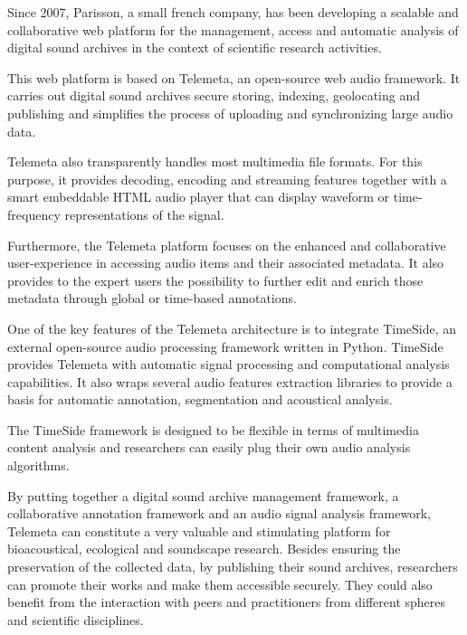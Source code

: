 Since 2007, Parisson, a small french company,  has been developing a scalable and collaborative web platform for the management, access and automatic analysis of digital sound archives in the context of scientific research activities.

This web platform is based on Telemeta, an open-source web audio framework.
It carries out digital sound archives secure storing, indexing, geolocating  and publishing and simplifies the process of uploading and synchronizing large audio data.

Telemeta also transparently handles most multimedia file formats. For this purpose, it provides decoding, encoding and streaming features together with a smart embeddable HTML audio player that can display waveform or time-frequency representations of the signal.

Furthermore, the Telemeta platform focuses on the enhanced and collaborative user-experience in accessing audio items and their associated metadata.
It also provides to the expert users the possibility to further edit and enrich those metadata through global or time-based annotations.

One of the key features of the Telemeta architecture is to integrate TimeSide,  an external open-source audio processing framework written in Python.
TimeSide provides Telemeta with automatic signal processing and computational analysis capabilities. It also  wraps several audio features extraction libraries to provide a basis for automatic annotation, segmentation and acoustical analysis.

The TimeSide framework is designed to be flexible in terms of multimedia content analysis and researchers can easily plug their own audio analysis algorithms.
 
By putting together a digital sound archive management framework, a collaborative annotation framework and an audio signal analysis framework, Telemeta can constitute a very valuable and stimulating platform for bioacoustical, ecological and soundscape research.
Besides ensuring the preservation of the collected data, by publishing their sound archives, researchers can promote their works and make them accessible securely. They could also benefit from the interaction with peers and practitioners from different spheres and scientific disciplines.